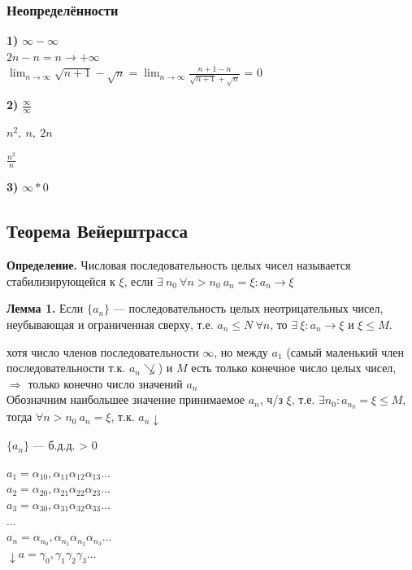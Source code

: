 \documentclass{article}
\begin{document}
    \subsubsection{Неопределённости}

    \textbf{1)} \(\infty - \infty\)
    \\ \(2n - n = n \rightarrow +\infty\)
    \\ \(\lim_{n \rightarrow \infty}{\sqrt{n+1} - \sqrt{n}} = \lim_{n \rightarrow \infty}{\frac{n+1-n}{\sqrt{n+1}+\sqrt{n}}}\) = 0

    \textbf{2)} \( \frac{\infty}{\infty} \)

    \( n^2,\ n,\ 2n \)
    
    \( \frac{n^2}{n}  \) %

    \textbf{3)} \(\infty * 0\)
    
    \subsection{Теорема Вейерштрасса}

    \textbf{Определение.}
    Числовая последовательность целых чисел называется стабилизирующейся к \(\xi\), если \( \exists\ n_0\ \forall n > n_0\  a_n = \xi: a_n \rightarrow \xi \)
    
    \textbf{Лемма 1.}
    Если \(\{a_n\}\) --- последовательность целых неотрицательных чисел, неубывающая и ограниченная сверху, т.е. \( a_n \leq N\ \forall n\), то \( \exists\ \xi: a_n \rightarrow \xi \) и \( \xi \leq M \).

    хотя число членов последовательности \(\infty\), но между \(a_1\) (самый маленький член последовательности т.к. \( a_n \not\searrow \)) и \(M\) есть только конечное число целых чисел, \(\Rightarrow\) только конечно число значений \(a_n\)\\
    Обозначним наибольшее значение принимаемое \( a_n \), ч/з \( \xi \), т.е. \( \exists n_0: a_{n_0} = \xi \leq M \), тогда \( \forall n > n_0\ a_n = \xi \), т.к. \( a_n \downarrow \)
    
    \(\{a_n\}\) --- б.д.д. > 0
    
    \(a_1 = \alpha_{10},\alpha_{11}\alpha_{12}\alpha_{13}...\)\\
    \(a_2 = \alpha_{20},\alpha_{21}\alpha_{22}\alpha_{23}...\)\\
    \(a_3 = \alpha_{30},\alpha_{31}\alpha_{32}\alpha_{33}...\)\\
    ...\\
    \(a_n = \alpha_{n_0},\alpha_{n_1}\alpha_{n_2}\alpha_{n_3}...\)\\
    \(\downarrow a = \gamma_0,\gamma_1\gamma_2\gamma_3...\)
\end{document}
